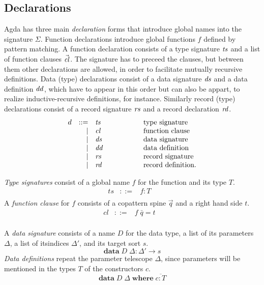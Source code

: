 \documentclass[acmlarge,fleqn]{acmart}\settopmatter{}
\begin{document}
\subsection{Declarations}
\label{sec:declarations}

Agda has three main \emph{declaration} forms that introduce global names into
the signature $\Sigma$.  Function declarations introduce global
functions $f$ defined by pattern matching.  A function declaration
consists of a type signature $\mathit{ts}$ and a list of function clauses
$\vec{\mathit{cl}}$.  The signature has to preceed the clauses, but between
them other declarations are allowed, in order to facilitate mutually
recursive definitions.  Data (type) declarations consist of a data
signature $\mathit{ds}$ and a data definition $\mathit{dd}$, which have to appear in
this order but can also be appart, to realize inductive-recursive
definitions, for instance.  Similarly record (type) declarations
consist of a record signature $\mathit{rs}$ and a record declaration $\mathit{rd}$.
\[
\begin{array}{lrl@{\hspace{2cm}}l}
d  & ::=  & \mathit{ts} & \mbox{type signature}
\\ & \mid & \mathit{cl} & \mbox{function clause}
\\ & \mid & \mathit{ds} & \mbox{data signature}
\\ & \mid & \mathit{dd} & \mbox{data definition}
\\ & \mid & \mathit{rs} & \mbox{record signature}
\\ & \mid & \mathit{rd} & \mbox{record definition}.

\end{array}
 \]

\emph{Type signatures} consist of a global name $f$ for the function and its type $T$.
\[\begin{array}{lrll}
ts &::=& f : T &\\
\end{array} \]
A \emph{function clause} for $f$ consists of a copattern spine $\vec q$ and a right hand side $t$.
\[
\begin{array}{lrll}
cl &::=& f\; \bar{q} = t &\\
\end{array}
\]

A \emph{data signature} consists of a name $D$ for the data type,
a list of its parameters $\Delta$,
a list of itsindices $\Delta'$,
and its target sort $s$.
\[
\textbf{data}\; D\; \Delta : \Delta' \to s
\]
\emph{Data definitions} repeat the parameter telescope $\Delta$,
since parameters will be mentioned in the types $T$ of the constructors $c$.
\[
\textbf{data}\; D\; \Delta \;\textbf{where}\; \overline{c : T}
\]
\end{document}
